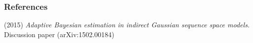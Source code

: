 \documentclass[english,fleqn]{beamer}%
\renewcommand{\1}{\mathbbm{1}}
\newcommand{\dg}{\color{dgreen}}
\newcommand{\ds}{\color{black}}
\theoremstyle{mydefi}
\theoremstyle{mynote}
\begin{document}
\begin{frame}
  \frametitle{References}
{\small{\begin{thebibliography}{10}       
\beamertemplatearticlebibitems



 


\bibitem{[5]}\dg {J.J., A. Simoni and  R. Schenk} (2015)
{\ds\it Adaptive  Bayesian estimation in indirect  Gaussian sequence space models.}
{\ds Discussion paper (arXiv:1502.00184)}






\end{thebibliography}}}
\end{frame}
\end{document}
